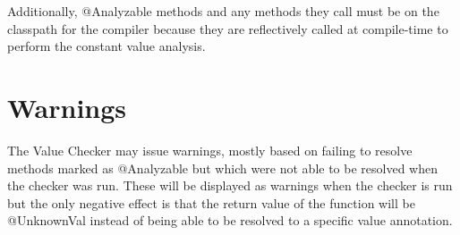 Additionally, @Analyzable methods and any methods they call must be on
the classpath for the compiler because they are reflectively called at
compile-time to perform the constant value analysis.

\section{Warnings}
The Value Checker may issue warnings, mostly based on failing to
resolve methods marked as @Analyzable but which were not able to be
resolved when the checker was run. These will be displayed as warnings when
the checker is run but the only negative effect is that the return
value of the function will be @UnknownVal instead of being able to be
resolved to a specific value annotation.



